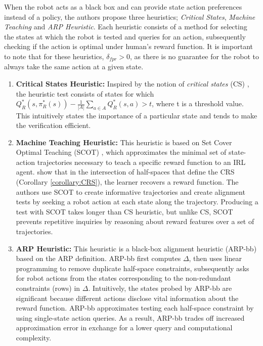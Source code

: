 When the robot acts as a black box and can provide state action preferences instead of a policy, the authors propose three heuristics; \textit{Critical States}, \textit{Machine Teaching} and \textit{ARP Heuristic}. Each heuristic consists of a method for selecting the states at which the robot is tested and queries for an action, subsequently checking if the action is optimal under human's reward function. It is important to note that for these heuristics, $\delta_{fpr} > 0$, as there is no guarantee for the robot to always take the same action at a given state.

\begin{enumerate}
    \item \textbf{Critical States Heuristic:} Inspired by the notion of \textit{critical states} (CS) \cite{huang2018establishing}, the heuristic test consists of states for which $Q_{R}^* (s, \pi_{R}^*(s)) - \frac{1}{|A|} \sum_{a \in A} Q_{R}^*(s, a) > t$, where t is a threshold value. This intuitively states the importance of a particular state and tends to make the verification efficient.
    
    \item \textbf{Machine Teaching Heuristic:} This heuristic is based on Set Cover Optimal Teaching (SCOT) \cite{brown2019machine}, which approximates the minimal set of state-action trajectories necessary to teach a specific reward function to an IRL agent. \cite{brown2019machine} show that in the intersection of half-spaces that define the CRS (Corollary \ref{corollary:CRS}), the learner recovers a reward function. The authors use SCOT to create informative trajectories and create alignment tests by seeking a robot action at each state along the trajectory. Producing a test with SCOT takes longer than CS heuristic, but unlike CS, SCOT prevents repetitive inquiries by reasoning about reward features over a set of trajectories.
    
    \item \textbf{ARP Heuristic:} This heuristic is a black-box alignment heuristic (ARP-bb) based on the ARP definition. ARP-bb first computes $\Delta$, then uses linear programming to remove duplicate half-space constraints, subsequently asks for robot actions from the states corresponding to the non-redundant constraints (rows) in $\Delta$. Intuitively, the states probed by ARP-bb are significant because different actions disclose vital information about the reward function. ARP-bb approximates testing each half-space constraint by using single-state action queries. As a result, ARP-bb trades off increased approximation error in exchange for a lower query and computational complexity.
\end{enumerate}

